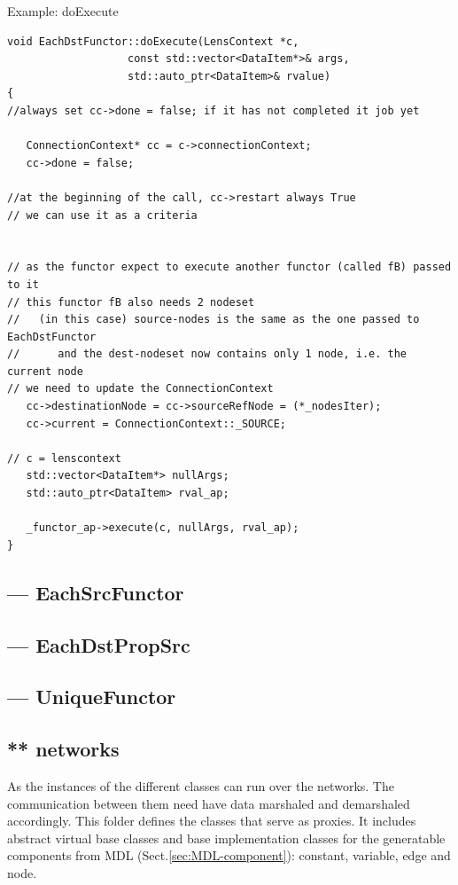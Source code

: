 Example: doExecute
{\tiny
\begin{lstlisting}
void EachDstFunctor::doExecute(LensContext *c, 
			       const std::vector<DataItem*>& args, 
			       std::auto_ptr<DataItem>& rvalue)
{
//always set cc->done = false; if it has not completed it job yet

   ConnectionContext* cc = c->connectionContext;
   cc->done = false;

//at the beginning of the call, cc->restart always True
// we can use it as a criteria 


// as the functor expect to execute another functor (called fB) passed to it
// this functor fB also needs 2 nodeset 
//   (in this case) source-nodes is the same as the one passed to EachDstFunctor
//      and the dest-nodeset now contains only 1 node, i.e. the current node
// we need to update the ConnectionContext
   cc->destinationNode = cc->sourceRefNode = (*_nodesIter);
   cc->current = ConnectionContext::_SOURCE;

// c = lenscontext
   std::vector<DataItem*> nullArgs;
   std::auto_ptr<DataItem> rval_ap;

   _functor_ap->execute(c, nullArgs, rval_ap);
}
\end{lstlisting}
}

\subsection{--- EachSrcFunctor}
\label{sec:EachSrcFunctor}

\subsection{--- EachDstPropSrc}
\label{sec:EachDstPropSrc}


\subsection{--- UniqueFunctor}
\label{sec:UniqueFunctor}


\subsection{ ** networks}

As the instances of the different classes can run over the networks. The
communication between them need have data marshaled and demarshaled accordingly.
This folder defines the classes that serve as proxies.
It includes abstract virtual base classes and base implementation classes for
the generatable components from MDL (Sect.\ref{sec:MDL-component}): constant,
variable, edge and node.
 
